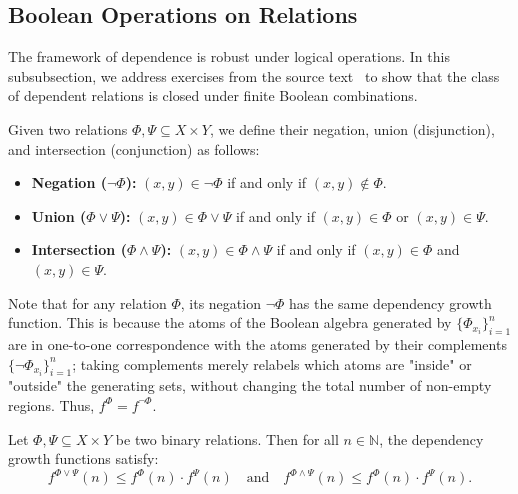 \subsection{Boolean Operations on Relations}

The framework of dependence is robust under logical operations. In this subsubsection, we address exercises from the source text~\cite[Chap 5, \S 2]{vandenDries1998} to show that the class of dependent relations is closed under finite Boolean combinations.


Given two relations $\Phi, \Psi \subseteq X \times Y$, we define their negation, union (disjunction), and intersection (conjunction) as follows:
\begin{itemize}
    \item \textbf{Negation ($\neg\Phi$):} $(x,y) \in \neg\Phi$ if and only if $(x,y) \notin \Phi$.
    \item \textbf{Union ($\Phi \lor \Psi$):} $(x,y) \in \Phi \lor \Psi$ if and only if $(x,y) \in \Phi$ or $(x,y) \in \Psi$.
    \item \textbf{Intersection ($\Phi \land \Psi$):} $(x,y) \in \Phi \land  \Psi$ if and only if $(x,y) \in \Phi$ and $(x,y) \in \Psi$.
\end{itemize}
Note that for any relation $\Phi$, its negation $\neg\Phi$ has the same dependency growth function. This is because the atoms of the Boolean algebra generated by $\{\Phi_{x_i}\}_{i=1}^n$ are in one-to-one correspondence with the atoms generated by their complements $\{\neg\Phi_{x_i}\}_{i=1}^n$; taking complements merely relabels which atoms are "inside" or "outside" the generating sets, without changing the total number of non-empty regions. Thus, $f^\Phi = f^{\neg\Phi}$.

\begin{lemma}
    Let $\Phi, \Psi \subseteq X \times Y$ be two binary relations. Then for all $n \in \mathbb{N}$, the dependency growth functions satisfy:
    \[
        f^{\Phi \lor \Psi}(n) \le f^\Phi(n) \cdot f^\Psi(n) \quad \text{and} \quad f^{\Phi  \land  \Psi}(n) \le f^\Phi(n) \cdot f^\Psi(n).
    \]
\end{lemma}

